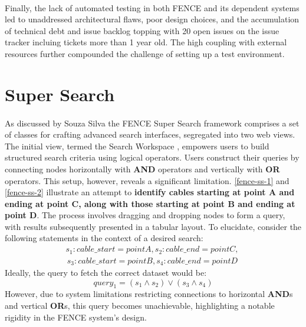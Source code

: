 \paragraph{}Finally, the lack of automated testing in both FENCE and its dependent systems led to unaddressed architectural flaws, poor design choices, and the accumulation of technical debt and issue backlog topping with 20 open issues on the issue tracker incluing tickets more than 1 year old. The high coupling with external resources further compounded the challenge of setting up a test environment.

\section{Super Search}

\paragraph{} As discussed by Souza Silva \cite{SouzaSilva2023Glance} the FENCE Super Search framework comprises a set of classes for crafting advanced search interfaces, segregated into two web views. The initial view, termed the Search Workspace \cite{fence-2015}, empowers users to build structured search criteria using logical operators. Users construct their queries by connecting nodes horizontally with \textbf{AND} operators and vertically with \textbf{OR} operators. This setup, however, reveals a significant limitation. \autoref{fence-ss-1} and \autoref{fence-ss-2} illustrate an attempt to \textbf{identify cables starting at point A and ending at point C, along with those starting at point B and ending at point D}. The process involves dragging and dropping nodes to form a query, with results subsequently presented in a tabular layout. To elucidate, consider the following statements in the context of a desired search:
\begin{equation}
\begin{split}
s_1: cable\_start = point A,
s_2: cable\_end = point C, \
\end{split}
\end{equation}
\begin{equation}
\begin{split}
s_3: cable\_start = point B,
s_4: cable\_end = point D \
\end{split}
\end{equation}
Ideally, the query to fetch the correct dataset would be:
\begin{equation}
query_1 = (s_1 \land s_2) \lor (s_3 \land s_4)
\end{equation}
\noindent
However, due to system limitations restricting connections to horizontal \textbf{AND}s and vertical \textbf{OR}s, this query becomes unachievable, highlighting a notable rigidity in the FENCE system's design.

